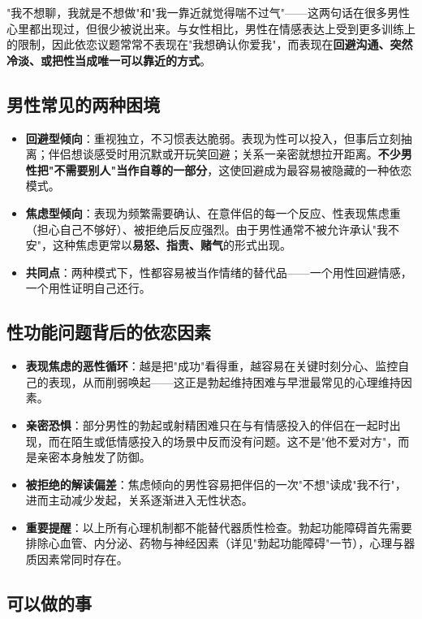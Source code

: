 "我不想聊，我就是不想做"和"我一靠近就觉得喘不过气"——这两句话在很多男性心里都出现过，但很少被说出来。与女性相比，男性在情感表达上受到更多训练上的限制，因此依恋议题常常不表现在"我想确认你爱我"，而表现在\textbf{回避沟通、突然冷淡、或把性当成唯一可以靠近的方式}。

\subsection{男性常见的两种困境}

\begin{itemize}
	\item \textbf{回避型倾向}：重视独立，不习惯表达脆弱。表现为性可以投入，但事后立刻抽离；伴侣想谈感受时用沉默或开玩笑回避；关系一亲密就想拉开距离。\textbf{不少男性把"不需要别人"当作自尊的一部分}，这使回避成为最容易被隐藏的一种依恋模式。
	\item \textbf{焦虑型倾向}：表现为频繁需要确认、在意伴侣的每一个反应、性表现焦虑重（担心自己不够好）、被拒绝后反应强烈。由于男性通常不被允许承认"我不安"，这种焦虑更常以\textbf{易怒、指责、赌气}的形式出现。
	\item \textbf{共同点}：两种模式下，性都容易被当作情绪的替代品——一个用性回避情感，一个用性证明自己还行。
\end{itemize}

\subsection{性功能问题背后的依恋因素}

\begin{itemize}
	\item \textbf{表现焦虑的恶性循环}：越是把"成功"看得重，越容易在关键时刻分心、监控自己的表现，从而削弱唤起——这正是勃起维持困难与早泄最常见的心理维持因素。
	\item \textbf{亲密恐惧}：部分男性的勃起或射精困难只在与有情感投入的伴侣在一起时出现，而在陌生或低情感投入的场景中反而没有问题。这不是"他不爱对方"，而是亲密本身触发了防御。
	\item \textbf{被拒绝的解读偏差}：焦虑倾向的男性容易把伴侣的一次"不想"读成"我不行"，进而主动减少发起，关系逐渐进入无性状态。
	\item \textbf{重要提醒}：以上所有心理机制都不能替代器质性检查。勃起功能障碍首先需要排除心血管、内分泌、药物与神经因素（详见"勃起功能障碍"一节），心理与器质因素常同时存在。
\end{itemize}

\subsection{可以做的事}

